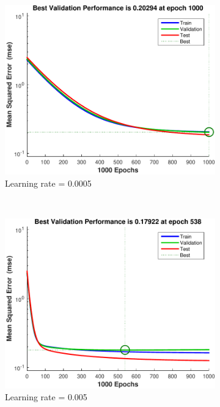 \documentclass[12pt, a4paper]{article}
\begin{document}
\begin{figure}[htbp]
		\centering
		\begin{subfigure}[b]{0.48\textwidth}
			\includegraphics[width=\textwidth]{Q3-0005}
			\caption{Learning rate = 0.0005}
			\label{Q3.0005}
		\end{subfigure}
		~
		\begin{subfigure}[b]{0.48\textwidth}
			\includegraphics[width=\textwidth]{Q3-005}
			\caption{Learning rate = 0.005}
			\label{Q3.005}
		\end{subfigure}
		\\
		\begin{subfigure}[b]{0.48\textwidth}

\end{subfigure}
\end{figure}
\end{document}
